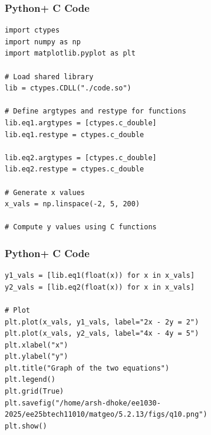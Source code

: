 \documentclass{beamer}
\begin{document}
\begin{frame}[fragile]
    \frametitle{Python+ C Code}
\begin{lstlisting}
import ctypes
import numpy as np
import matplotlib.pyplot as plt

# Load shared library
lib = ctypes.CDLL("./code.so")

# Define argtypes and restype for functions
lib.eq1.argtypes = [ctypes.c_double]
lib.eq1.restype = ctypes.c_double

lib.eq2.argtypes = [ctypes.c_double]
lib.eq2.restype = ctypes.c_double

# Generate x values
x_vals = np.linspace(-2, 5, 200)

# Compute y values using C functions
\end{lstlisting}
\end{frame}

\begin{frame}[fragile]
    \frametitle{Python+ C Code}
\begin{lstlisting}
y1_vals = [lib.eq1(float(x)) for x in x_vals]
y2_vals = [lib.eq2(float(x)) for x in x_vals]

# Plot
plt.plot(x_vals, y1_vals, label="2x - 2y = 2")
plt.plot(x_vals, y2_vals, label="4x - 4y = 5")
plt.xlabel("x")
plt.ylabel("y")
plt.title("Graph of the two equations")
plt.legend()
plt.grid(True)
plt.savefig("/home/arsh-dhoke/ee1030-2025/ee25btech11010/matgeo/5.2.13/figs/q10.png")
plt.show()

\end{lstlisting}
\end{frame}
\end{document}
